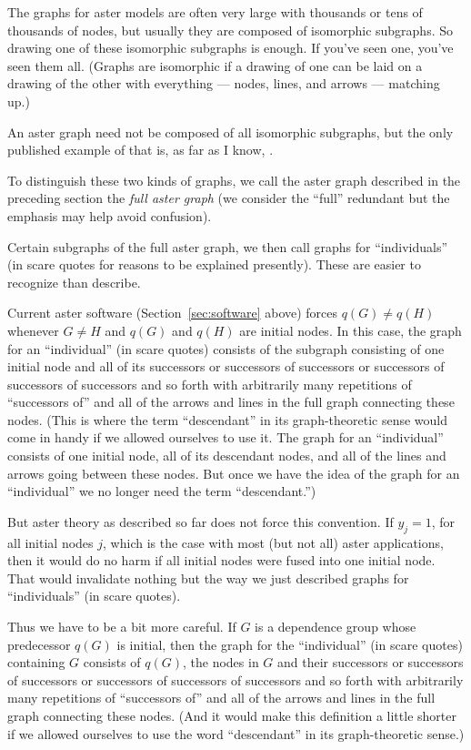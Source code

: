 The graphs for aster models are often very large with thousands or tens of
thousands of nodes, but usually they are composed of isomorphic subgraphs.
So drawing one of these isomorphic subgraphs is enough.
If you've seen one, you've seen them all.
(Graphs are isomorphic if a drawing of one can be laid on a drawing of the
other with everything --- nodes, lines, and arrows --- matching up.)

An aster graph need not be composed of all isomorphic subgraphs,
but the only published example of that is, as far as I know,
\citet{aster-hornworm}.

To distinguish these two kinds of graphs, we call the aster graph described
in the preceding section the \emph{full aster graph} (we consider the ``full''
redundant but the emphasis may help avoid confusion).

Certain subgraphs of the full aster graph, we then call graphs
for ``individuals'' (in scare quotes for reasons to be explained presently).
These are easier to recognize than describe.

Current aster software (Section~\ref{sec:software} above) forces
$q(G) \neq q(H)$ whenever $G \neq H$ and $q(G)$ and $q(H)$ are initial nodes.
In this case, the graph for an ``individual'' (in scare quotes)
consists of the subgraph consisting of one initial node and all of its
successors or successors of successors or successors of successors
of successors and so forth with arbitrarily many repetitions
of ``successors of'' and all of the arrows and lines in the full graph
connecting these nodes.  (This is where the term ``descendant'' in its
graph-theoretic sense would
come in handy if we allowed ourselves to use it.  The graph for an
``individual'' consists of one initial node, all of its descendant nodes,
and all of the lines and arrows going between these nodes.  But once we
have the idea of the graph for an ``individual'' we no longer need the
term ``descendant.'')

But aster theory as described so far does not force this convention.
If $y_j = 1$, for all initial nodes $j$, which is the case with most
(but not all) aster applications, then it would do no harm if all initial
nodes were fused into one initial node.  That would invalidate nothing but
the way we just described graphs for ``individuals'' (in scare quotes).

Thus we have to be a bit more careful.  If $G$ is a dependence group whose
predecessor $q(G)$ is initial, then the graph for the ``individual''
(in scare quotes) containing $G$ consists of $q(G)$, the nodes in $G$
and their successors or successors of successors or successors of successors
of successors and so forth with arbitrarily many repetitions
of ``successors of'' and all of the arrows and lines in the full graph
connecting these nodes.  (And it would make this definition a little shorter
if we allowed ourselves to use the word ``descendant'' in its graph-theoretic
sense.)

